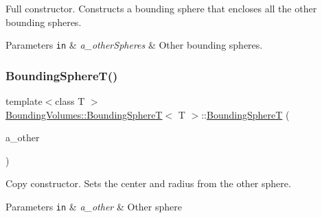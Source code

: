 Full constructor. Constructs a bounding sphere that encloses all the other bounding spheres. 


\begin{DoxyParams}[1]{Parameters}
\mbox{\tt in}  & {\em a\+\_\+other\+Spheres} & Other bounding spheres. \\
\hline
\end{DoxyParams}
\mbox{\label{classBoundingVolumes_1_1BoundingSphereT_afd5a1632d9ceef8a4fa3af59e562c7f8}} 
\subsubsection{\texorpdfstring{Bounding\+Sphere\+T()}{BoundingSphereT()}\hspace{0.1cm}{\footnotesize\ttfamily [3/4]}}
{\footnotesize\ttfamily template$<$class T $>$ \\
\hyperlink{classBoundingVolumes_1_1BoundingSphereT}{Bounding\+Volumes\+::\+Bounding\+SphereT}$<$ T $>$\+::\hyperlink{classBoundingVolumes_1_1BoundingSphereT}{Bounding\+SphereT} (\begin{DoxyParamCaption}\item[{const \hyperlink{classBoundingVolumes_1_1BoundingSphereT}{Bounding\+SphereT}$<$ T $>$ \&}]{a\+\_\+other }\end{DoxyParamCaption})}



Copy constructor. Sets the center and radius from the other sphere. 


\begin{DoxyParams}[1]{Parameters}
\mbox{\tt in}  & {\em a\+\_\+other} & Other sphere \\
\hline
\end{DoxyParams}
\mbox{\label{classBoundingVolumes_1_1BoundingSphereT_a88655edd39b6276b9bb58eb9bd6af82d}} 
